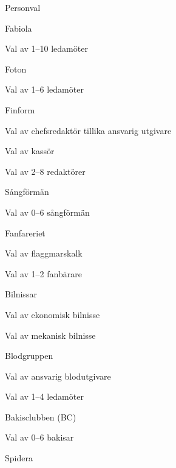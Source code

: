 \documentclass[prelim]{sektionsmote}
\begin{document}
\begin{ootd}
\item{Personval}
\begin{ootd}
    \item Fabiola
    \begin{ootd}
        \item Val av 1--10 ledamöter
    \end{ootd}
    \item Foton
    \begin{ootd}
        \item Val av 1--6 ledamöter
    \end{ootd}
    \item Finform
    \begin{ootd}
        \item Val av chefsredaktör tillika ansvarig utgivare
        \item Val av kassör
        \item Val av 2--8 redaktörer
    \end{ootd}
    \item Sångförmän
    \begin{ootd}
        \item Val av 0--6 sångförmän
    \end{ootd}
    \item Fanfareriet
    \begin{ootd}
        \item Val av flaggmarskalk
        \item Val av 1--2 fanbärare
    \end{ootd}
    \item Bilnissar
    \begin{ootd}
        \item Val av ekonomisk bilnisse
        \item Val av mekanisk bilnisse
    \end{ootd}
    \item Blodgruppen
    \begin{ootd}
        \item Val av ansvarig blodutgivare
        \item Val av 1--4 ledamöter
    \end{ootd}
    \item Bakisclubben (BC)
    \begin{ootd}
        \item Val av 0--6 bakisar
    \end{ootd}
    \item Spidera
    \begin{ootd}

\end{ootd}
\end{ootd}
\end{ootd}
\end{document}
